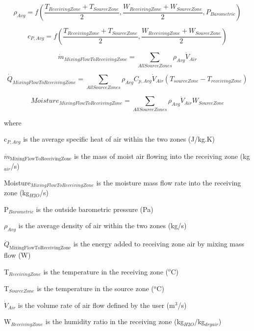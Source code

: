 \begin{equation}
\rho_{Avg} = f \left( \frac{T_{ReceivingZone} + T_{SourceZone}}{2},\frac{W_{ReceivingZone} + W_{SourceZone}}{2},P_{Barometric} \right)
\end{equation}

\begin{equation}
c_{P,Avg} = f \left( \frac{T_{ReceivingZone} + T_{SourceZone}}{2},\frac{W_{ReceivingZone} + W_{SourceZone}}{2} \right)
\end{equation}

\begin{equation}
\dot m_{MixingFlowToReceivingZone} = \sum_{AllSourceZones} \rho_{Avg}\dot V_{Air}
\end{equation}

\begin{equation}
\dot Q_{MixingFlowToReceivingZone} = \sum_{AllSourceZones} \rho_{Avg}C_{p,Avg}\dot V_{Air} (T_{sourceZone}-T_{receivingZone})
\end{equation}

\begin{equation}
{Moisture}_{MixingFlowToReceivingZone} = \sum_{AllSourceZones} \rho_{Avg} \dot V_{Air} W_{SourceZone}
\end{equation}

where

c\(_{P,Avg}\) is the average specific heat of air within the two zones (J/kg.K)

\({\dot m_{{\mathrm{MixingFlowToReceivingZone}}}}\) is the mass of moist air flowing into the receiving zone (kg\(_{air}\)/s)

Moisture\(_{MixingFlowToReceivingZone}\) is the moisture mass flow rate into the receiving zone (kg\(_{H2O}\)/s)

P\(_{Barometric}\) is the outside barometric pressure (Pa)

\(\rho_{Avg}\) is the average density of air within the two zones (kg/s)

\({\dot Q_{{\mathrm{MixingFlowToReceivingZone}}}}\) is the energy added to receiving zone air by mixing mass flow (W)

T\(_{ReceivingZone}\) is the temperature in the receiving zone (\(^{o}\)C)

T\(_{SourceZone}\) is the temperature in the source zone (\(^{o}\)C)

\({\dot V_{Air}}\) is the volume rate of air flow defined by the user (m\(^{3}\)/s)

W\(_{ReceivingZone}\) is the humidity ratio in the receiving zone (kg\(_{H2O}\)/kg\(_{dry air}\))

